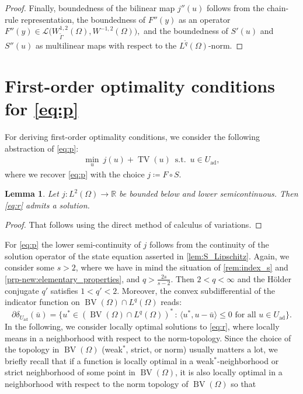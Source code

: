 \documentclass[11pt]{article}
\newcommand{\R}{\mathbb{R}}
\DeclareMathOperator*{\BV}{BV}
\DeclareMathOperator*{\TV}{TV}
\newcommand{\feas}{U_{\textrm{ad}}}
\newtheorem{lemma}[theorem]{Lemma}
\theoremstyle{definition}
\theoremstyle{remark}
\begin{document}
\begin{proof}
Finally, boundedness of the bilinear map $j''(u)$ follows from the chain-rule representation,
the boundedness of $F''(y)$ as an operator
$
F''(y)\in \mathcal L\bigl(W^{1,2}_{\tilde\Gamma}(\Omega),W^{-1,2}(\Omega)\bigr),$ 
and the boundedness of $S'(u)$ and $S''(u)$ as multilinear maps with respect to the
$L^{\tilde q}(\Omega)$-norm.
\end{proof}

\section{First-order optimality conditions for
\texorpdfstring{\eqref{eq:p}}{(P)}}
\label{sec:first-order_opt}
%
For deriving first-order optimality conditions, we consider the following 
abstraction of \eqref{eq:p}:
%
\begin{gather}\label{eq:r}
\min_{u}\ j(u) + \TV(u)
\ \operatorname{s.t.}\ u \in \feas,
\tag{P$'$}
\end{gather}
%
where we recover \eqref{eq:p} with the choice $j \coloneqq F \circ S$.
%
\begin{lemma}
Let $j : L^2(\Omega) \to \R$ be bounded below and lower semicontinuous. Then \eqref{eq:r} admits a solution.
\end{lemma}
\begin{proof}
That follows using the direct method of calculus of variations.
\end{proof}
%
For \eqref{eq:p} the lower semi-continuity of $j$ follows from the continuity of the solution operator of the state equation asserted
in \cref{lem:S_Lipschitz}. Again, we consider some $s > 2$, where we have in mind the situation of \cref{rem:index_s} and 
\cref{prp-new:elementary_properties}, and $q > \frac{2s}{s - 2}$. Then $2 < q < \infty$ and the Hölder conjugate $q'$
satisfies $1 < q' < 2$. Moreover, the convex subdifferential of the indicator function on $\BV(\Omega) \cap L^{q}(\Omega)$
reads:
%
\[ \partial \delta_{\feas}(\bar{u}) = \{u^* \in (\BV(\Omega) \cap L^{q}(\Omega))^* \,:\, \langle u^*, u - \bar{u} \rangle \le 0
\text{ for all } u \in \feas\}.
\]
%
In the following, we consider locally optimal solutions to \eqref{eq:r}, where locally means in a neighborhood with respect
to the norm-topology. Since the choice of the topology in $\BV(\Omega)$ (weak$^*$, strict, or norm) usually matters a lot,
we briefly recall that if a function is locally optimal in a weak$^*$-neighborhood or strict neighborhood of some point in
$\BV(\Omega)$, it is also locally optimal in a neighborhood with respect to the norm topology of $\BV(\Omega)$ so that
\end{document}

